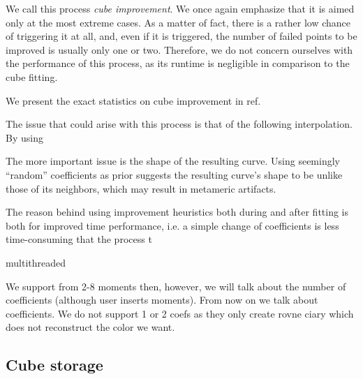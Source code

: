 We call this process \emph{cube improvement}. We once again emphasize that it is aimed only at the most extreme cases. As a matter of fact, there is a rather low chance of triggering it at all, and, even if it is triggered, the number of failed points to be improved is usually only one or two. Therefore, we do not concern ourselves with the performance of this process, as its runtime is negligible in comparison to the cube fitting.

We present the exact statistics on cube improvement in ref.

The issue that could arise with this process is that of the following interpolation. By using

The more important issue is the shape of the resulting curve. Using seemingly ``random'' coefficients as prior suggests the resulting curve's shape to be unlike those of its neighbors, which may result in metameric artifacts.

The reason behind using improvement heuristics both during and after fitting is both for improved time performance, i.e. a simple change of coefficients is less time-consuming that the process t

multithreaded 

We support from 2-8 moments then, however, we will talk about the number of coefficients (although user inserts moments). From now on we talk about coefficients. We do not support 1 or 2 coefs as they only create rovne ciary which does not reconstruct the color we want.

\subsection{Cube storage}
	
